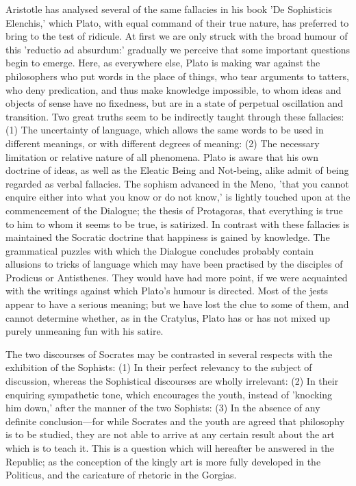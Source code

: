 \documentclass[11pt,letter]{article}
\begin{document}
\par  Aristotle has analysed several of the same fallacies in his book 'De Sophisticis Elenchis,' which Plato, with equal command of their true nature, has preferred to bring to the test of ridicule. At first we are only struck with the broad humour of this 'reductio ad absurdum:' gradually we perceive that some important questions begin to emerge. Here, as everywhere else, Plato is making war against the philosophers who put words in the place of things, who tear arguments to tatters, who deny predication, and thus make knowledge impossible, to whom ideas and objects of sense have no fixedness, but are in a state of perpetual oscillation and transition. Two great truths seem to be indirectly taught through these fallacies: (1) The uncertainty of language, which allows the same words to be used in different meanings, or with different degrees of meaning: (2) The necessary limitation or relative nature of all phenomena. Plato is aware that his own doctrine of ideas, as well as the Eleatic Being and Not-being, alike admit of being regarded as verbal fallacies. The sophism advanced in the Meno, 'that you cannot enquire either into what you know or do not know,' is lightly touched upon at the commencement of the Dialogue; the thesis of Protagoras, that everything is true to him to whom it seems to be true, is satirized. In contrast with these fallacies is maintained the Socratic doctrine that happiness is gained by knowledge. The grammatical puzzles with which the Dialogue concludes probably contain allusions to tricks of language which may have been practised by the disciples of Prodicus or Antisthenes. They would have had more point, if we were acquainted with the writings against which Plato's humour is directed. Most of the jests appear to have a serious meaning; but we have lost the clue to some of them, and cannot determine whether, as in the Cratylus, Plato has or has not mixed up purely unmeaning fun with his satire.

\par  The two discourses of Socrates may be contrasted in several respects with the exhibition of the Sophists: (1) In their perfect relevancy to the subject of discussion, whereas the Sophistical discourses are wholly irrelevant: (2) In their enquiring sympathetic tone, which encourages the youth, instead of 'knocking him down,' after the manner of the two Sophists: (3) In the absence of any definite conclusion—for while Socrates and the youth are agreed that philosophy is to be studied, they are not able to arrive at any certain result about the art which is to teach it. This is a question which will hereafter be answered in the Republic; as the conception of the kingly art is more fully developed in the Politicus, and the caricature of rhetoric in the Gorgias.
\end{document}
